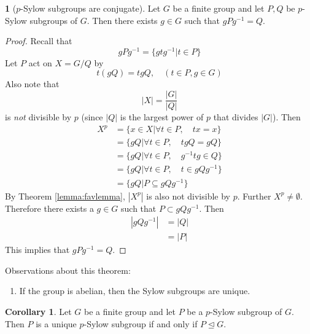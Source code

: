 \documentclass[12pt]{article}
\theoremstyle{definition}
\newtheorem{theorem}{\color{ForestGreen}{\textbf{Theorem}}}
\newtheorem{corollary}{Corollary}
\theoremstyle{definition}
\begin{document}
\begin{theorem}[$p$-Sylow subgroups are conjugate]
	Let $G$ be a finite group and let $P,Q$ be $p$-Sylow subgroups of $G$. Then there exists $g \in G$ such that $gPg^{-1} = Q$. 
\end{theorem}
\begin{proof}
	Recall that 
	\begin{equation}
		gPg^{-1} = \{gtg^{-1} |t \in P\}
	\end{equation}
	Let $P$ act on $X = G/Q$ by 
	\begin{equation}
		t(gQ) = tgQ, \quad (t \in P, g \in G)
	\end{equation}
	Also note that
	\begin{equation}
		|X| = \frac{|G|}{|Q|}
	\end{equation}
	is \emph{not} divisible by $p$ (since $|Q|$ is the largest power of $p$ that divides $|G|$). Then
	\begin{align*}
		X^p &= \{x \in X | \forall t \in P, \quad tx = x\} \\
		&= \{gQ | \forall t \in P, \quad tgQ= gQ\} \\
		&= \{gQ | \forall t \in P, \quad g^{-1}tg \in Q\} \\
		&= \{gQ | \forall t \in P, \quad t \in gQg^{-1}\} \\
		&= \{gQ | P \subseteq gQg^{-1}\}
	\end{align*} 
	By Theorem \ref{lemma:favlemma}, $|X^p|$ is also not divisible by $p$. Further $X^p \neq \emptyset$. Therefore there exists a $g \in G$ such that $P \subset gQg^{-1}$. Then
	\begin{align*}
		|gQg^{-1}| &= |Q| \tag{conjugation is a bijective operation} \\
		&= |P| \tag{since both $p$-Sylow subgroups}
	\end{align*}
	This implies that $gPg^{-1} = Q$. 
\end{proof}

Observations about this theorem:
\begin{enumerate}
	\item If the group is abelian, then the Sylow subgroups are unique.
\end{enumerate}

\begin{corollary}
	Let $G$ be a finite group and let $P$ be a $p$-Sylow subgroup of $G$. Then $P$ is a unique $p$-Sylow subgroup if and only if $P \trianglelefteq G$. 
\end{corollary}
\end{document}

